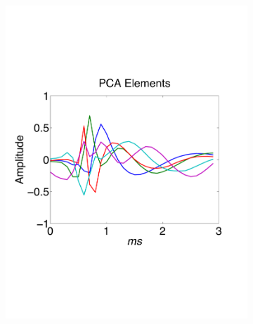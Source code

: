 
\begin{center}
\begin{figure}[h!]
\begin{subfigure}[b]{.45\textwidth}
\includegraphics[width=1\textwidth]{../figs/new/pcaelements.pdf}
\caption{}
\end{subfigure}
\begin{subfigure}[b]{.45\textwidth}

\end{subfigure}
\end{figure}
\end{center}
